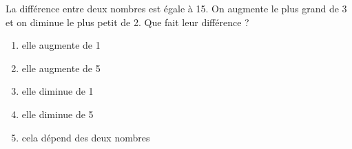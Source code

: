 La différence entre deux nombres est égale à 15. On augmente le plus
grand de 3 et on diminue le plus petit de 2. Que fait leur différence
?
\begin{multicols}{3}
  \begin{enumerate}[A/]
  \item elle augmente de 1
  \item elle augmente de 5
  \item elle diminue de 1
  \item elle diminue de 5
  \item cela dépend des deux nombres
  \end{enumerate}
\end{multicols}